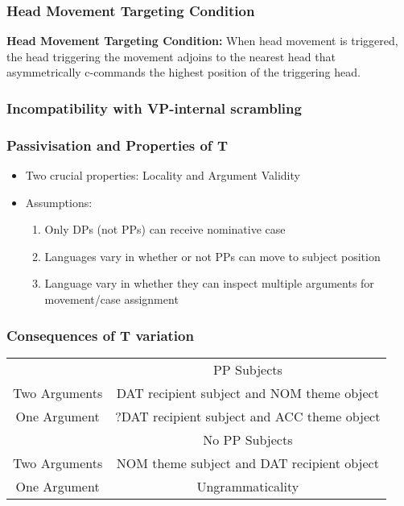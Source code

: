 \documentclass{beamer}
\begin{document}
 \begin{frame}
	\frametitle{Head Movement Targeting Condition}
	\vfill
	 	\textbf{Head Movement Targeting Condition:} When head movement is triggered, the head triggering the movement adjoins to the nearest head that asymmetrically c-commands the highest position of the triggering head.
	\vfill
 \end{frame}
 \begin{frame}
	 \frametitle{Incompatibility with VP-internal scrambling}
\end{frame}

\begin{frame}
	\frametitle{Passivisation and Properties of T}
	\begin{itemize}
		\item Two crucial properties: Locality and Argument Validity
		\item Assumptions:
		\begin{enumerate}
			\item Only DPs (not PPs) can receive nominative case
			\item Languages vary in whether or not PPs can move to subject position
			\item Language vary in whether they can inspect multiple arguments for movement/case assignment
		\end{enumerate}
	\end{itemize}
\end{frame}

\begin{frame}
	\frametitle{Consequences of T variation}
	\begin{tabular}{cc}
		&	PP Subjects \\
Two Arguments	& DAT recipient subject and NOM theme object \\
One Argument    & ?DAT recipient subject and ACC theme object\\
\hline
	      & No PP Subjects \\
Two Arguments & NOM theme subject and DAT recipient object\\
One Argument  & Ungrammaticality\\
	\end{tabular}
\end{frame}
\end{document}

